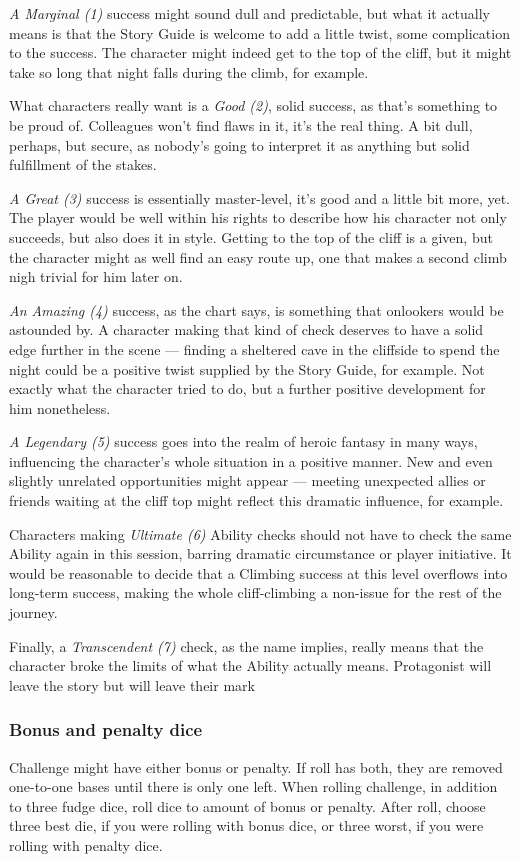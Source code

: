 \textit{A Marginal (1)} success might sound dull and predictable, but what it actually means is that the Story Guide is welcome to add a little twist, some complication to the success. 
The character might indeed get to the top of the cliff, but it might take so long that night falls during the climb, for example.

What characters really want is a \textit{Good (2)}, solid success, as that’s something to be proud of. 
Colleagues won’t find flaws in it, it’s the real thing. 
A bit dull, perhaps, but secure, as nobody’s going to interpret it as anything but solid fulfillment of the stakes.

\textit{A Great (3)} success is essentially master-level, it’s good and a little bit more, yet. 
The player would be well within his rights to describe how his character not only succeeds, but also does it in style. 
Getting to the top of the cliff is a given, but the character might as well find an easy route up, one that makes a second climb nigh trivial for him later on.

\textit{An Amazing (4)} success, as the chart says, is something that onlookers would be astounded by. 
A character making that kind of check deserves to have a solid edge further in the scene
	 — finding a sheltered cave in the cliffside to spend the night could be a positive twist supplied by the Story Guide, for example. 
Not exactly what the character tried to do, but a further positive development for him nonetheless.

\textit{A Legendary (5)} success goes into the realm of heroic fantasy in many ways, influencing the character’s whole situation in a positive manner. 
New and even slightly unrelated opportunities might appear — meeting unexpected allies or friends waiting at the cliff top might reflect this dramatic influence, for example.

Characters making \textit{Ultimate (6)} Ability checks should not have to check the same Ability again in this session, barring dramatic circumstance or player initiative. 
It would be reasonable to decide that a Climbing success at this level overflows into long-term success, making the whole cliff-climbing a non-issue for the rest of the journey.

Finally, a \textit{Transcendent (7)} check, as the name implies, really means that the character broke the limits of what the Ability actually means.
Protagonist will leave the story but will leave their mark

\subsubsection{Bonus and penalty dice}
Challenge might have either bonus or penalty.
If roll has both, they are removed one-to-one bases until there is only one left.
When rolling challenge, in addition to three fudge dice, roll dice to amount of bonus or penalty.
After roll, choose three best die, if you were rolling with bonus dice, or three worst, if you were rolling with penalty dice.

